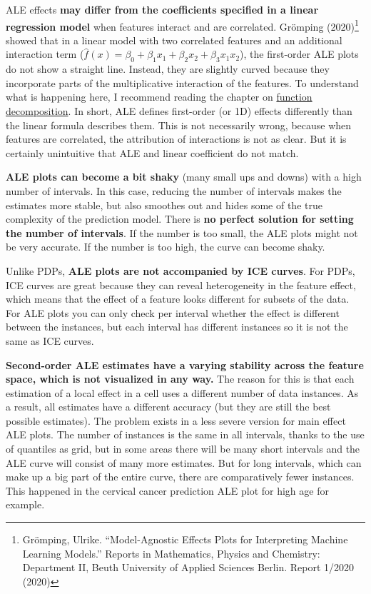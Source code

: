 \documentclass[
  10pt,
]{scrbook}
\begin{document}
ALE effects \textbf{may differ from the coefficients specified in a linear regression model} when features interact and are correlated.
Grömping (2020)\footnote{Grömping, Ulrike. ``Model-Agnostic Effects Plots for Interpreting Machine Learning Models.'' Reports in Mathematics, Physics and Chemistry: Department II, Beuth University of Applied Sciences Berlin. Report 1/2020 (2020)} showed that in a linear model with two correlated features and an additional interaction term (\(\hat{f}(x) = \beta_0 + \beta_1 x_1 + \beta_2 x_2 + \beta_3 x_1 x_2\)), the first-order ALE plots do not show a straight line.
Instead, they are slightly curved because they incorporate parts of the multiplicative interaction of the features.
To understand what is happening here, I recommend reading the chapter on \protect\hyperlink{decomposition}{function decomposition}.
In short, ALE defines first-order (or 1D) effects differently than the linear formula describes them.
This is not necessarily wrong, because when features are correlated, the attribution of interactions is not as clear.
But it is certainly unintuitive that ALE and linear coefficient do not match.

\textbf{ALE plots can become a bit shaky} (many small ups and downs) with a high number of intervals.
In this case, reducing the number of intervals makes the estimates more stable, but also smoothes out and hides some of the true complexity of the prediction model.
There is \textbf{no perfect solution for setting the number of intervals}.
If the number is too small, the ALE plots might not be very accurate.
If the number is too high, the curve can become shaky.

Unlike PDPs, \textbf{ALE plots are not accompanied by ICE curves}.
For PDPs, ICE curves are great because they can reveal heterogeneity in the feature effect, which means that the effect of a feature looks different for subsets of the data.
For ALE plots you can only check per interval whether the effect is different between the instances, but each interval has different instances so it is not the same as ICE curves.

\textbf{Second-order ALE estimates have a varying stability across the feature space, which is not visualized in any way.}
The reason for this is that each estimation of a local effect in a cell uses a different number of data instances.
As a result, all estimates have a different accuracy (but they are still the best possible estimates).
The problem exists in a less severe version for main effect ALE plots.
The number of instances is the same in all intervals, thanks to the use of quantiles as grid, but in some areas there will be many short intervals and the ALE curve will consist of many more estimates.
But for long intervals, which can make up a big part of the entire curve, there are comparatively fewer instances.
This happened in the cervical cancer prediction ALE plot for high age for example.
\end{document}
